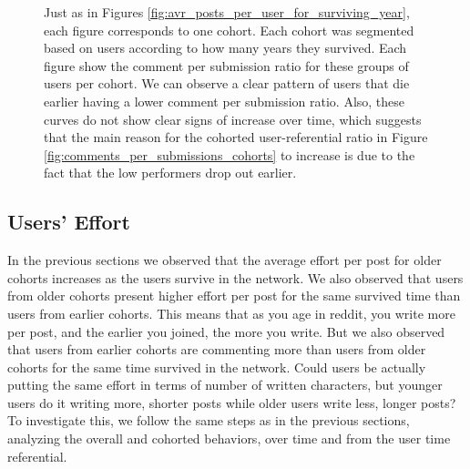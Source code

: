 \begin{figure}[!tb]
\caption{Just as in Figures \ref{fig:avr_posts_per_user_for_surviving_year}, each figure corresponds to one cohort. Each cohort was segmented based on users according to how many years they survived. Each figure show the comment per submission ratio for these groups of users per cohort. We can observe a clear pattern of users that die earlier having a lower comment per submission ratio. Also, these curves do not show clear signs of increase over time, which suggests that the main reason for the cohorted user-referential ratio in Figure \ref{fig:comments_per_submissions_cohorts} to increase is due to the fact that the low performers drop out earlier.}
\label{fig:comments_per_submissions_for_surviving_year}
\end{figure}

\subsection{Users' Effort}

In the previous sections we observed that the average effort per post for older cohorts increases as the users survive in the network. We also observed that users from older cohorts present higher effort per post for the same survived time than users from earlier cohorts. This means that as you age in reddit, you write more per post, and the earlier you joined, the more you write. But we also observed that users from earlier cohorts are commenting more than users from older cohorts for the same time survived in the network. Could users be actually putting the same effort in terms of number of written characters, but younger users do it writing more, shorter posts while older users write less, longer posts? To investigate this, we follow the same steps as in the previous sections, analyzing the overall and cohorted behaviors, over time and from the user time referential.

